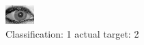 \begin{figure}[h!]
\begin{center}
\includegraphics[width=0.60\columnwidth]{figures/ID2033_class_1_target_2.png}
\end{center}
\caption{ Classification: 1 actual target: 2}
\label{fig:ID2033_class_1_target_2}
\end{figure}
